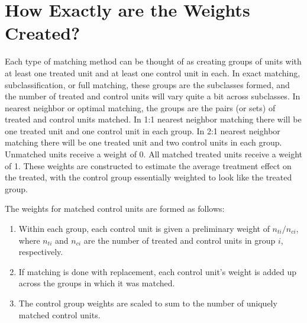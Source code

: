 %

\section{How Exactly are the Weights Created?}
\label{subsec:weights}

Each type of matching method can be thought of as creating groups of
units with at least one treated unit and at least one control unit in
each.  In exact matching, subclassification, or full matching, these
groups are the subclasses formed, and the number of treated and
control units will vary quite a bit across subclasses.  In nearest
neighbor or optimal matching, the groups are the pairs (or sets) of
treated and control units matched.  In 1:1 nearest neighbor matching
there will be one treated unit and one control unit in each group.  In
2:1 nearest neighbor matching there will be one treated unit and two
control units in each group.  Unmatched units receive a weight of 0.
All matched treated units receive a weight of 1.  These weights are constructed
to estimate the average treatment effect on the treated, with the control group
essentially weighted to look like the treated group.

The weights for matched control units are formed as follows:
\begin{enumerate}
\item Within each group, each control unit is given a preliminary
  weight of $n_{ti}/n_{ci}$, where $n_{ti}$ and $n_{ci}$ are the
  number of treated and control units in group $i$, respectively.
\item If matching is done with replacement, each control unit's weight
  is added up across the groups in which it was matched.
\item The control group weights are scaled to sum to the number of
  uniquely matched control units.
\end{enumerate}

